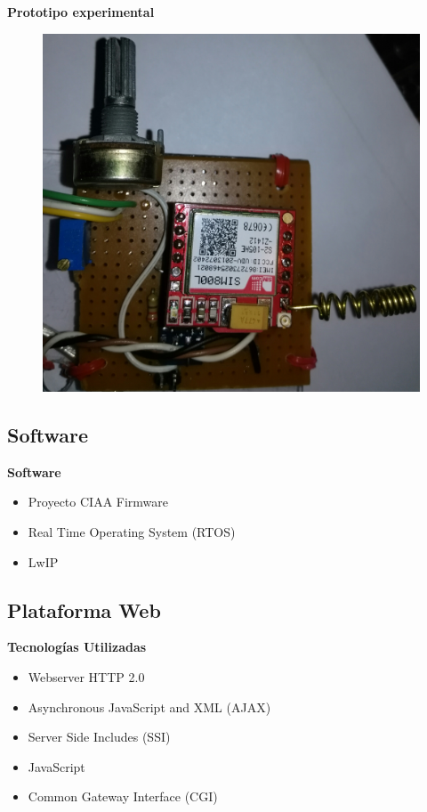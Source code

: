 \documentclass[11pt]{beamer}
\begin{document}
\begin{frame}{\textbf{\LARGE{Prototipo experimental}}}
  \vspace{-.7cm}
  \begin{figure}[H]
    {\includegraphics[width=.5\textwidth]{./imagenes/placa_basica.jpg}}
  \end{figure}	
\end{frame}

\subsection{Software}
\begin{frame}{\textbf{\LARGE{Software}}}
  \fontsize{18pt}{18}\selectfont
    \begin{itemize}
      \item Proyecto CIAA Firmware
      \vspace{15px}
      \item Real Time Operating System (RTOS)
      \vspace{15px}
      \item LwIP
    \end{itemize}

\end{frame}


\subsection{Plataforma Web}

\begin{frame}{\textbf{\LARGE{Tecnologías Utilizadas}}}
  \fontsize{18pt}{18}\selectfont
  \begin{itemize}
    \item Webserver HTTP 2.0
      \vspace{10px}
    \item Asynchronous JavaScript and XML (AJAX)
      \vspace{10px}		
    \item Server Side Includes (SSI)
      \vspace{10px}
    \item JavaScript
      \vspace{10px}
    \item Common Gateway Interface (CGI)
  \end{itemize}
\end{frame}
\end{document}
